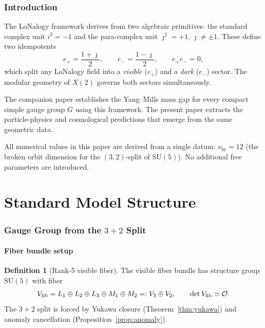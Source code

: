 \documentclass[12pt]{article}
\theoremstyle{plain}
\theoremstyle{definition}
\newtheorem{definition}[theorem]{Definition}
\numberwithin{equation}{section}
\newcommand{\br}{\mathrm{br}}
\begin{document}
\setcounter{page}{1}
\tableofcontents
\newpage

\section*{Introduction}

The LoNalogy framework derives from two algebraic primitives: the standard
complex unit $i^2=-1$ and the para-complex unit $\jmath^2=+1$, $\jmath\neq\pm1$.
These define two idempotents
\[
e_+ = \frac{1+\jmath}{2},\qquad e_- = \frac{1-\jmath}{2},\qquad e_+e_-=0,
\]
which split any LoNalogy field into a \emph{visible} ($e_+$) and a
\emph{dark} ($e_-$) sector.  The modular geometry of $X(2)$ governs both
sectors simultaneously.

The companion paper \cite{YMmassGap} establishes the Yang--Mills mass gap
for every compact simple gauge group $G$ using this framework.  The present
paper extracts the particle-physics and cosmological predictions that emerge
from the same geometric data.

All numerical values in this paper are derived from a single datum:
$\nu_\br=12$ (the broken orbit dimension for the $(3,2)$-split of $\mathrm{SU}(5)$).
No additional free parameters are introduced.

\part{Standard Model Structure}

\section{Gauge Group from the $3+2$ Split}\label{sec:gaugegroup}

\subsection{Fiber bundle setup}

\begin{definition}[Rank-5 visible fiber]
The visible fiber bundle has structure group $\mathrm{SU}(5)$ with fiber
\[
V_{\rm fib} = L_1\oplus L_2\oplus L_3\oplus M_1\oplus M_2
=: V_3\oplus V_2,\qquad \det V_{\rm fib}\simeq\mathcal{O}.
\]
The $3+2$ split is forced by Yukawa closure (Theorem~\ref{thm:yukawa})
and anomaly cancellation (Proposition~\ref{prop:anomaly}).
\end{definition}
\end{document}
